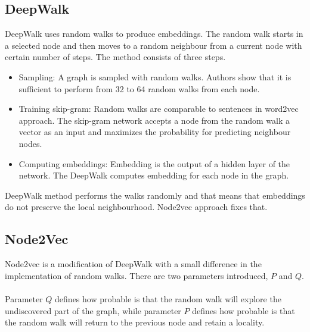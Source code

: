 \subsection{DeepWalk}

DeepWalk uses random walks to produce embeddings. The random walk starts in a selected node and then moves to a random neighbour from a current node with certain number of steps. The method consists of three steps.

 \begin{itemize}
  \item Sampling: A graph is sampled with random walks. Authors show that it is sufficient to perform from 32 to 64 random walks from each node. 
  
    
  \item Training skip-gram: Random walks are comparable to sentences in word2vec approach. The skip-gram network accepts a node from the random walk a vector as an input and maximizes the probability for predicting neighbour nodes. 
  
  \item Computing embeddings: Embedding is the output of a hidden layer of the network. The DeepWalk computes embedding for each node in the graph.
   
  \end{itemize}

\noindent  DeepWalk method performs the walks randomly and that means that embeddings do not preserve the local neighbourhood. Node2vec approach fixes that.

\subsection{Node2Vec}

Node2vec is a modification of DeepWalk with a small difference in  the implementation of random walks. There are two parameters introduced, $P$ and $Q$. 
\\
\\
Parameter $Q$ defines how probable is that the random walk will explore the undiscovered part of the graph, while parameter $P$ defines how probable is that the random walk will return to the previous node and retain a locality.

\clearpage




